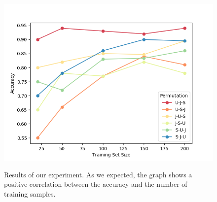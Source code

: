 \begin{figure}[h]
  \centering
  \includegraphics[width=1\textwidth]{images/validation-plot.png}
  \label{fig:validaton-plot}
  \caption{Results of our experiment. As we expected, the graph shows a positive correlation between the accuracy and the number of training samples.}
\end{figure}



